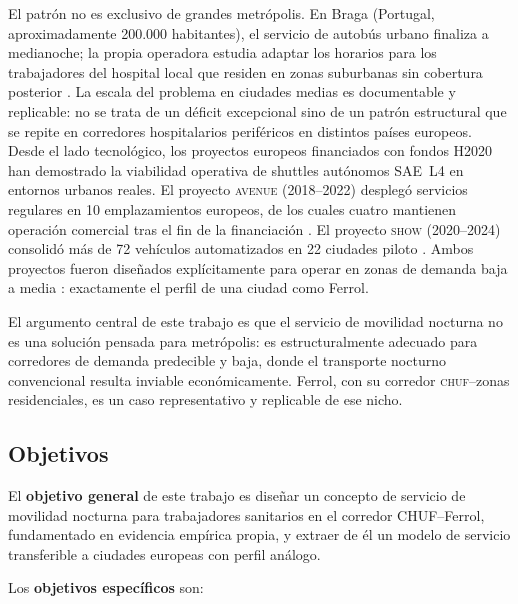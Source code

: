 \begin{claimS}
El patrón no es exclusivo de grandes metrópolis. En Braga (Portugal,
aproximadamente 200.000 habitantes), el servicio de autobús urbano
finaliza a medianoche; la propia operadora estudia adaptar los horarios
para los trabajadores del hospital local que residen en zonas suburbanas
sin cobertura posterior \cite{dAntonio2024}. La escala del problema en
ciudades medias es documentable y replicable: no se trata de un déficit
excepcional sino de un patrón estructural que se repite en corredores
hospitalarios periféricos en distintos países europeos.
Desde el lado tecnológico, los proyectos europeos financiados con fondos
H2020 han demostrado la viabilidad operativa de shuttles autónomos
SAE~L4 en entornos urbanos reales. El proyecto \textsc{avenue} (2018--2022)
desplegó servicios regulares en 10 emplazamientos europeos, de los cuales
cuatro mantienen operación comercial tras el fin de la financiación
\parencite{AVENUE2023}. El proyecto \textsc{show} (2020--2024) consolidó
más de 72 vehículos automatizados en 22 ciudades piloto
\parencite{SHOW2024Legacy}. Ambos proyectos fueron diseñados explícitamente
para operar en zonas de demanda baja a media \parencite{AVENUE2023}:
exactamente el perfil de una ciudad como Ferrol.
\end{claimS}

El argumento central de este trabajo es que el servicio de movilidad nocturna 
no es una solución pensada para metrópolis: es estructuralmente adecuado para corredores
de demanda predecible y baja, donde el transporte nocturno convencional
resulta inviable económicamente. Ferrol, con su corredor \textsc{chuf}--zonas
residenciales, es un caso representativo y replicable de ese nicho.



\subsection{Objetivos}
\label{sec:objetivos}

El \textbf{objetivo general} de este trabajo es diseñar un concepto de servicio de 
movilidad nocturna para trabajadores sanitarios en el corredor CHUF–Ferrol, 
fundamentado en evidencia empírica propia, y extraer de él un modelo de servicio 
transferible a ciudades europeas con perfil análogo.

Los \textbf{objetivos específicos} son:

